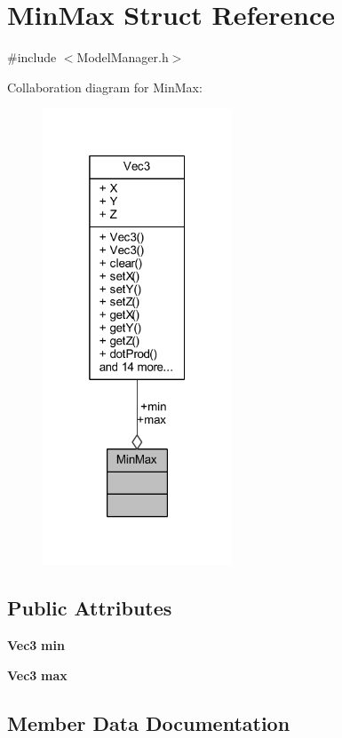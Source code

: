 \section{Min\+Max Struct Reference}
\label{struct_min_max}


{\ttfamily \#include $<$Model\+Manager.\+h$>$}



Collaboration diagram for Min\+Max\+:\nopagebreak
\begin{figure}[H]
\begin{center}
\leavevmode
\includegraphics[width=160pt]{d8/ddc/struct_min_max__coll__graph}
\end{center}
\end{figure}
\subsection*{Public Attributes}
\begin{DoxyCompactItemize}
\item 
{\bf Vec3} {\bf min}
\item 
{\bf Vec3} {\bf max}
\end{DoxyCompactItemize}


\subsection{Member Data Documentation}
